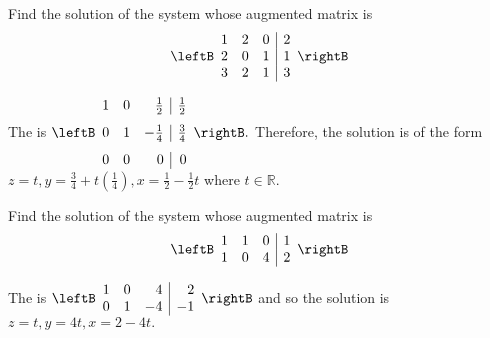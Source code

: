 \begin{enumialphparenastyle}
\begin{ex} Find the solution of the system whose augmented matrix is 
\begin{equation*}
\leftB
\begin{array}{rrr|r}
1 & 2 & 0 & 2 \\
2 & 0 & 1 & 1 \\
3 & 2 & 1 & 3
\end{array}
\rightB 
\end{equation*}
\begin{sol}
The \rref\; is $\leftB
\begin{array}{rrr|r}
1 & 0 & \vspace{0.05in}\frac{1}{2} & \vspace{0.05in}\frac{1}{2} \\
0 & 1 & -\vspace{0.05in}\frac{1}{4} & \vspace{0.05in}\frac{3}{4} \\
0 & 0 & 0 & 0
\end{array}
\rightB .$ Therefore, the solution is of the form $z=t,y=\frac{3}{4}+t\left(
\frac{1}{4}\right) ,x=\frac{1}{2}-\frac{1}{2}t$ where $t\in \mathbb{R}$.
\end{sol}
\end{ex}

\begin{ex} Find the solution of the system whose augmented matrix is 
\begin{equation*}
\leftB
\begin{array}{rrr|r}
1 & 1 & 0 & 1 \\
1 & 0 & 4 & 2
\end{array}
\rightB 
\end{equation*}
\begin{sol}
The \rref \;is $\leftB
\begin{array}{rrr|r}
1 & 0 & 4 & 2 \\
0 & 1 & -4 & -1
\end{array}
\rightB $ and so the solution is $z=t,y=4t,x=2-4t.$
\end{sol}
\end{ex}


\end{enumialphparenastyle}
